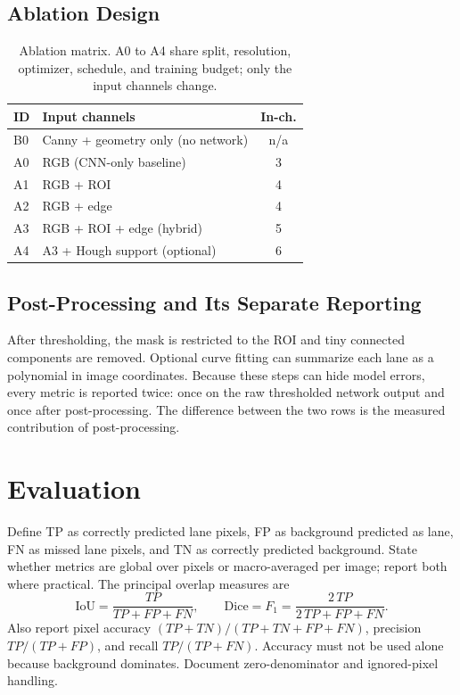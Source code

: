 \documentclass[10pt,a4paper,twocolumn]{article}
\begin{document}
\subsection{Ablation Design}\label{sec:ablation}
\begin{table}[H]
\centering
\caption{Ablation matrix. A0 to A4 share split, resolution, optimizer, schedule, and training budget; only the input channels change.}
\footnotesize
\begin{tabular}{|l|l|c|}
\hline
\rowcolor{gray!18}\textbf{ID}&\textbf{Input channels}&\textbf{In-ch.}\\ \hline
B0 & Canny + geometry only (no network) & n/a\\ \hline
A0 & RGB (CNN-only baseline) & 3\\ \hline
A1 & RGB + ROI & 4\\ \hline
A2 & RGB + edge & 4\\ \hline
A3 & RGB + ROI + edge (hybrid) & 5\\ \hline
A4 & A3 + Hough support (optional) & 6\\ \hline
\end{tabular}
\end{table}

\subsection{Post-Processing and Its Separate Reporting}
After thresholding, the mask is restricted to the ROI and tiny connected components are removed. Optional curve fitting can summarize each lane as a polynomial in image coordinates. Because these steps can hide model errors, every metric is reported twice: once on the raw thresholded network output and once after post-processing. The difference between the two rows is the measured contribution of post-processing.

\section{Evaluation}\label{sec:eval}
Define TP as correctly predicted lane pixels, FP as background predicted as lane, FN as missed lane pixels, and TN as correctly predicted background. State whether metrics are global over pixels or macro-averaged per image; report both where practical. The principal overlap measures are
\begin{equation}
\mathrm{IoU}=\frac{TP}{TP+FP+FN},\qquad
\mathrm{Dice}=F_1=\frac{2\,TP}{2\,TP+FP+FN}.
\end{equation}
Also report pixel accuracy $(TP+TN)/(TP+TN+FP+FN)$, precision $TP/(TP+FP)$, and recall $TP/(TP+FN)$. Accuracy must not be used alone because background dominates. Document zero-denominator and ignored-pixel handling.
\end{document}
